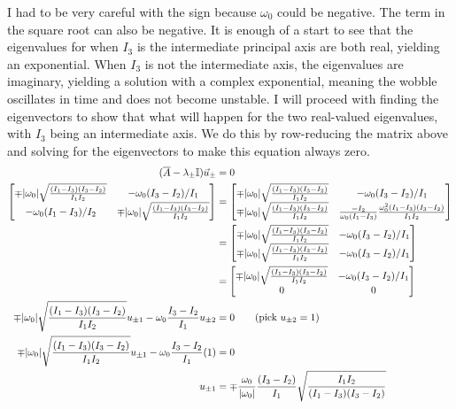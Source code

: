 \documentclass[10pt]{article}
\begin{document}
I had to be very careful with the sign because $\omega_0$ could be negative.
The term in the square root can also be negative.
It is enough of a start to see that the eigenvalues for when $I_3$ is the 
intermediate principal axis are both real, yielding an exponential. When 
$I_3$ is not the intermediate axis, the eigenvalues are imaginary, 
yielding a solution with a complex exponential, meaning the wobble 
oscillates in time and does not become unstable. 
I will proceed with finding the eigenvectors to show that what will 
happen for the two real-valued eigenvalues, with $I_3$ being an intermediate 
axis. We do this by row-reducing the matrix above and solving
for the eigenvectors to make this equation always zero.
\begin{align}
    (\overline{A} - \lambda_\pm\mathbb{I})\vec{u}_\pm &= 0 \notag\\
    \begin{bmatrix}
        \mp|\omega_0|\sqrt{\frac{(I_1-I_3)(I_3-I_2)}{I_1I_2}} & 
            -\omega_0(I_3 - I_2)/I_1 \\
        -\omega_0(I_1 - I_3)/I_2 & 
            \mp|\omega_0|\sqrt{\frac{(I_1-I_3)(I_3-I_2)}{I_1I_2}} 
    \end{bmatrix}
    &= 
    \begin{bmatrix}
        \mp|\omega_0|\sqrt{\frac{(I_1-I_3)(I_3-I_2)}{I_1I_2}} & 
            -\omega_0(I_3 - I_2)/I_1 \\
        \mp|\omega_0|\sqrt{\frac{(I_1-I_3)(I_3-I_2)}{I_1I_2}} & 
            \frac{-I_2}{\omega_0(I_1-I_3)}
            \frac{\omega_0^2(I_1-I_3)(I_3-I_2)}{I_1I_2}
    \end{bmatrix} \notag\\
    &=
    \begin{bmatrix}
        \mp|\omega_0|\sqrt{\frac{(I_1-I_3)(I_3-I_2)}{I_1I_2}} & 
            -\omega_0(I_3 - I_2)/I_1 \\
        \mp|\omega_0|\sqrt{\frac{(I_1-I_3)(I_3-I_2)}{I_1I_2}} & 
            -\omega_0(I_3 - I_2)/I_1 
    \end{bmatrix} \notag\\
    &=
    \begin{bmatrix}
        \mp|\omega_0|\sqrt{\frac{(I_1-I_3)(I_3-I_2)}{I_1I_2}} & 
            -\omega_0(I_3 - I_2)/I_1 \\
        0 & 0
    \end{bmatrix} \notag\\
    \mp|\omega_0|\sqrt{\frac{(I_1-I_3)(I_3-I_2)}{I_1I_2}}u_{\pm 1}
        -\omega_0\frac{I_3 - I_2}{I_1}u_{\pm 2} &= 0 \tag{pick $u_{\pm 2}=1$} \\
    \mp|\omega_0|\sqrt{\frac{(I_1-I_3)(I_3-I_2)}{I_1I_2}}u_{\pm 1}
        -\omega_0\frac{I_3 - I_2}{I_1}(1) &= 0 \notag\\
    u_{\pm 1} 
        &= \mp\frac{\omega_0}{|\omega_0|}\frac{(I_3-I_2)}{I_1}
            \sqrt{\frac{I_1I_2}{(I_1-I_3)(I_3-I_2)}} 
        \notag\\
\end{align}
\end{document}

